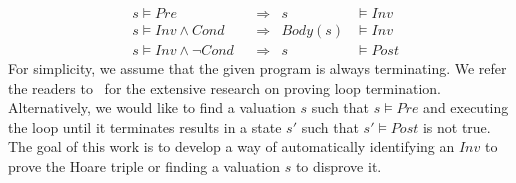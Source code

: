 \begin{align}
    &s \models \mathit{Pre}
        &&\Longrightarrow & s &\models \mathit{Inv} \label{inv:pre} \\
    &s \models \mathit{Inv} \wedge \mathit{Cond}
        &&\Longrightarrow & \mathit{Body}(s) &\models \mathit{Inv} \label{inv:loop} \\
    &s \models \mathit{Inv} \wedge \neg\mathit{Cond}
        &&\Longrightarrow & s &\models \mathit{Post} \label{inv:post}
\end{align}
For simplicity, we assume that the given program is always terminating. We refer the readers to~\cite{} for the extensive research on proving loop termination.
Alternatively, we would like to find a valuation $s$ such that $s \models \mathit{Pre}$ and executing the loop until it terminates results in a state $s'$ such that $s' \models \mathit{Post}$ is not true. The goal of this work is to develop a way of automatically identifying an $\mathit{Inv}$ to prove the Hoare triple or finding a valuation $s$ to disprove it.

